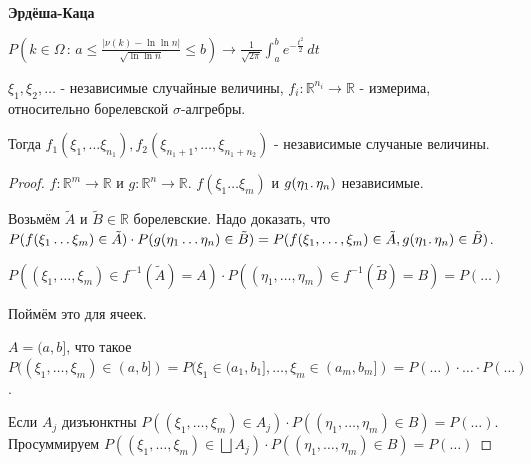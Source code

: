 \begin{remark}
    \begin{theorem}
        \textbf{Эрдёша-Каца}

        $P(k \in \Omega \, : \, a \leqslant \frac{|\nu (k) - \ln \ln n|}{\sqrt{\ln \ln n}} \leqslant b ) \rightarrow \frac{1}{\sqrt{2\pi}} \int_{a}^{b} e^{-\frac{t^2}{2}} \, dt $
    \end{theorem}
\end{remark}


\begin{theorem}
    $\xi_1, \xi_2, \ldots$ - независимые случайные величины, $f_i : \mathbb{R}^{n_i} \to \mathbb{R}$ - измерима,
    относительно борелевской $\sigma$-алгребры.

    Тогда $f_1 (\xi_1, \ldots \xi_{n_1}), f_2(\xi_{n_1 + 1}, \ldots, \xi_{n_1 + n_2})$ - независимые случаные величины.
\end{theorem}

\begin{proof}
    $f : \mathbb{R}^m \to \mathbb{R}$ и $g : \mathbb{R}^n \to \mathbb{R}$. $f(\xi_1 \ldots \xi_m)$ и
    $g(\eta_1 \ldotp \eta_n)$ независимые.

    Возьмём $\tilde{A}$ и $\tilde{B} \in \mathbb{R}$ борелевские. Надо доказать, что
    $P(f(\xi_1 \ldots \xi_m) \in \tilde{A}) \cdot P(g(\eta_1 \ldots \eta_n) \in \tilde{B}) =
    P(f(\xi_1, \ldots, \xi_m) \in \tilde{A}, g(\eta_1 \ldotp \eta_n) \in \tilde{B})$.

    $P((\xi_1, \ldots, \xi_m) \in f^{-1} (\tilde{A}) = A) \cdot P((\eta_1, \ldots, \eta_m) \in f^{-1} (\tilde{B}) = B) = P(\ldots)$

    Поймём это для ячеек.

    $A = (a, b]$, что такое $P((\xi_1, \ldots, \xi_m) \in (a, b]) = P(\xi_1 \in (a_1, b_1], \ldots, \xi_m \in (a_m, b_m]) = P(\ldots) \cdot \ldots \cdot P(\ldots)$.

    Если $A_j$ дизъюнктны $P((\xi_1, \ldots, \xi_m) \in A_j) \cdot P((\eta_1, \ldots, \eta_m) \in B) = P(\ldots).$
    Просуммируем $P((\xi_1, \ldots, \xi_m) \in \bigsqcup A_j) \cdot P((\eta_1, \ldots, \eta_m) \in B) = P(\ldots)$
\end{proof}

